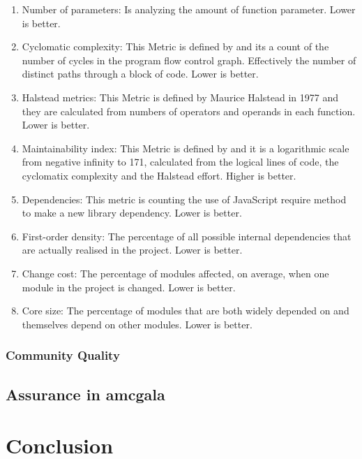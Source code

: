 \documentclass[DIV=calc,paper=a4,fontsize=9pt,twocolumn]{scrartcl}
\begin{document}
\begin{enumerate}
    \item Number of parameters: Is analyzing the amount of function parameter. Lower is better.
    \item Cyclomatic complexity: This Metric is defined by \citet{mccabe1976complexity} and its a count of the number of cycles in the program flow control graph. Effectively the number of distinct paths through a block of code. Lower is better.
    \item Halstead metrics: This Metric is defined by Maurice Halstead in 1977 \citep{zuse2005resolving} and they are calculated from numbers of operators and operands in each function. Lower is better.
    \item Maintainability index: This Metric is defined by \citet{oman1992metrics} and it is a logarithmic scale from negative infinity to 171, calculated from the logical lines of code, the cyclomatix complexity and the Halstead effort. Higher is better.
    \item Dependencies: This metric is counting the use of JavaScript require method to make a new library dependency. Lower is better.
    \item First-order density: The percentage of all possible internal dependencies that are actually realised in the project. Lower is better.
    \item Change cost: The percentage of modules affected, on average, when one module in the project is changed. Lower is better.
    \item Core size: The percentage of modules that are both widely depended on and themselves depend on other modules. Lower is better.
\end{enumerate}

\subsubsection{Community Quality}

\subsection{Assurance in amcgala}


\section{Conclusion}




\end{document}

